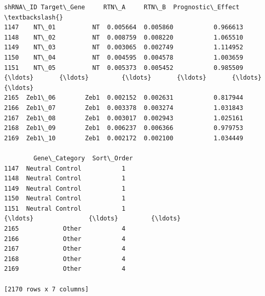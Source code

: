 \documentclass[11pt]{article}
\begin{document}
    
    \begin{Verbatim}[commandchars=\\\{\}]
     shRNA\_ID Target\_Gene     RTN\_A     RTN\_B  Prognostic\_Effect  \textbackslash{}
1147    NT\_01          NT  0.005664  0.005860           0.966613   
1148    NT\_02          NT  0.008759  0.008220           1.065510   
1149    NT\_03          NT  0.003065  0.002749           1.114952   
1150    NT\_04          NT  0.004595  0.004578           1.003659   
1151    NT\_05          NT  0.005373  0.005452           0.985509   
{\ldots}       {\ldots}         {\ldots}       {\ldots}       {\ldots}                {\ldots}   
2165  Zeb1\_06        Zeb1  0.002152  0.002631           0.817944   
2166  Zeb1\_07        Zeb1  0.003378  0.003274           1.031843   
2167  Zeb1\_08        Zeb1  0.003017  0.002943           1.025161   
2168  Zeb1\_09        Zeb1  0.006237  0.006366           0.979753   
2169  Zeb1\_10        Zeb1  0.002172  0.002100           1.034449   

        Gene\_Category  Sort\_Order  
1147  Neutral Control           1  
1148  Neutral Control           1  
1149  Neutral Control           1  
1150  Neutral Control           1  
1151  Neutral Control           1  
{\ldots}               {\ldots}         {\ldots}  
2165            Other           4  
2166            Other           4  
2167            Other           4  
2168            Other           4  
2169            Other           4  

[2170 rows x 7 columns]
    \end{Verbatim}
\end{document}
